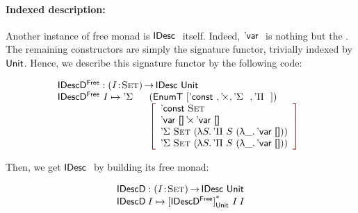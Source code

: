 \paragraph{Indexed description:}

Another instance of free monad is $\IDesc$ itself. Indeed, $\DVar$ is
nothing but the \return. The remaining constructors are simply the
signature functor, trivially indexed by $\Unit$. Hence, we describe
this signature functor by the following code:

\[\stk{
\IDescFreeD : \PI{\V{I}}{\Set} \IDesc{\Unit} \\
\begin{array}{@{}ll}
\IDescFreeD~I \mapsto \DSigma{}{} & (\EnumT \red{[} \DConst{},
                                              \DProd{}{},
                                              \DSigma{}{}, 
                                              \DPi{}{} \red{]}) \\
                                  & \bigRedBracket{\begin{array}{l}
                                        \DConst{\Set}               \\
                                        \DProd{\DVar{\Void}}{\DVar{\Void}}  \\
                                        \DSigma{\Set}{(\LAM{S} \DPi{S}{(\LAM{\_} \DVar{\Void})})} \\
                                        \DSigma{\Set}{(\LAM{S} \DPi{S}{(\LAM{\_} \DVar{\Void})})}
                                    \end{array}}
\end{array}
}\]

Then, we get $\IDesc$ by building its free monad:

\[\stk{
\IDescD : \PI{\V{I}}{\Set} \IDesc{\Unit} \\
\IDescD\: I \mapsto \FreeIMonad{\red{[}\IDescFreeD\red{]}}{\Unit}{I}\: I
}\]


